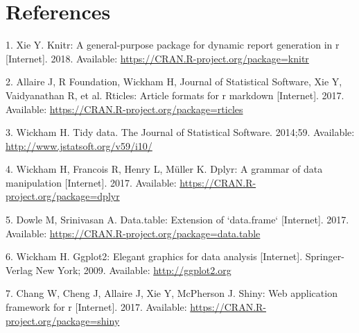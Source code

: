 \documentclass[10pt,letterpaper]{article}
\begin{document}
\newpage

\section*{References}\label{references}


\noindent

\setlength{\parindent}{-0.20in} \setlength{\leftskip}{0.20in}
\setlength{\parskip}{8pt}

\hypertarget{refs}{}
\hypertarget{ref-pkgknitr}{}
1. Xie Y. Knitr: A general-purpose package for dynamic report generation
in r {[}Internet{]}. 2018. Available:
\url{https://CRAN.R-project.org/package=knitr}

\hypertarget{ref-pkgrticles}{}
2. Allaire J, R Foundation, Wickham H, Journal of Statistical Software,
Xie Y, Vaidyanathan R, et al. Rticles: Article formats for r markdown
{[}Internet{]}. 2017. Available:
\url{https://CRAN.R-project.org/package=rticles}

\hypertarget{ref-pkgtidyr}{}
3. Wickham H. Tidy data. The Journal of Statistical Software. 2014;59.
Available: \url{http://www.jstatsoft.org/v59/i10/}

\hypertarget{ref-pkgdplyr}{}
4. Wickham H, Francois R, Henry L, Müller K. Dplyr: A grammar of data
manipulation {[}Internet{]}. 2017. Available:
\url{https://CRAN.R-project.org/package=dplyr}

\hypertarget{ref-pkgdatatable}{}
5. Dowle M, Srinivasan A. Data.table: Extension of `data.frame`
{[}Internet{]}. 2017. Available:
\url{https://CRAN.R-project.org/package=data.table}

\hypertarget{ref-pkgggplot2}{}
6. Wickham H. Ggplot2: Elegant graphics for data analysis
{[}Internet{]}. Springer-Verlag New York; 2009. Available:
\url{http://ggplot2.org}

\hypertarget{ref-pkgshiny}{}
7. Chang W, Cheng J, Allaire J, Xie Y, McPherson J. Shiny: Web
application framework for r {[}Internet{]}. 2017. Available:
\url{https://CRAN.R-project.org/package=shiny}

\nolinenumbers
\end{document}
